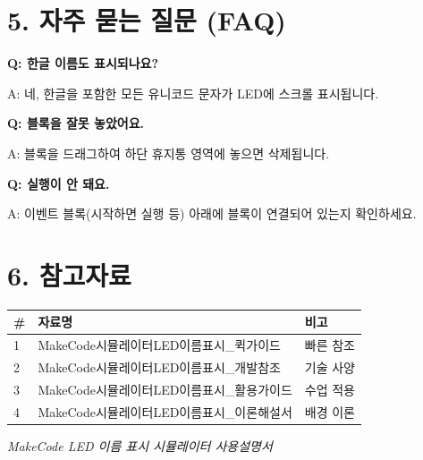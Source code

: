 \documentclass[11pt,a4paper]{article}
\begin{document}
\section*{5. 자주 묻는 질문 (FAQ)}

\textbf{Q: 한글 이름도 표시되나요?}


A: 네, 한글을 포함한 모든 유니코드 문자가 LED에 스크롤 표시됩니다.


\textbf{Q: 블록을 잘못 놓았어요.}


A: 블록을 드래그하여 하단  휴지통 영역에 놓으면 삭제됩니다.


\textbf{Q: 실행이 안 돼요.}


A: 이벤트 블록(시작하면 실행 등) 아래에 블록이 연결되어 있는지 확인하세요.



\section*{6. 참고자료}

\begin{center}
\renewcommand{\arraystretch}{1.4}
\begin{tabular}{|p{1.5cm}|p{10.9cm}|p{2.6cm}|}
\hline
\rowcolor{tableheader}
\textbf{\#} & \textbf{자료명} & \textbf{비고} \\
\hline
1 & MakeCode시뮬레이터LED이름표시\_퀵가이드 & 빠른 참조 \\
\hline
2 & MakeCode시뮬레이터LED이름표시\_개발참조 & 기술 사양 \\
\hline
3 & MakeCode시뮬레이터LED이름표시\_활용가이드 & 수업 적용 \\
\hline
4 & MakeCode시뮬레이터LED이름표시\_이론해설서 & 배경 이론 \\
\hline
\end{tabular}
\end{center}


\vfill
\begin{center}
\small\color{lightbrown}
\textit{MakeCode LED 이름 표시 시뮬레이터 사용설명서}
\end{center}
\end{document}

